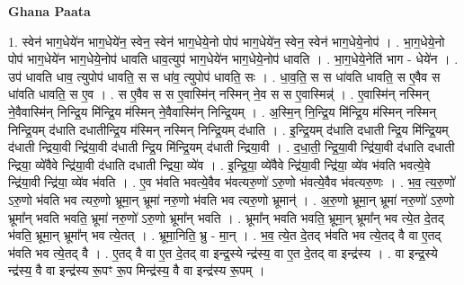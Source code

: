 \documentclass[17pt]{extarticle}
\begin{document}
\textbf{Ghana Paata } \newline

1. स्वेन॑ भाग॒धेये॑न भाग॒धेये॑न॒ स्वेन॒ स्वेन॑ भाग॒धेये॒नो पोप॑ भाग॒धेये॑न॒ स्वेन॒ स्वेन॑ भाग॒धेये॒नोप॑ । . भा॒ग॒धेये॒नो पोप॑ भाग॒धेये॑न भाग॒धेये॒नोप॑ धावति धाव॒त्युप॑ भाग॒धेये॑न भाग॒धेये॒नोप॑ धावति । . भा॒ग॒धेये॒नेति॑ भाग - धेये॑न । . उप॑ धावति धाव॒ त्युपोप॑ धावति॒ स स धा॑व॒ त्युपोप॑ धावति॒ सः । . धा॒व॒ति॒ स स धा॑वति धावति॒ स ए॒वैव स धा॑वति धावति॒ स ए॒व । . स ए॒वैव स स ए॒वास्मि॑न् नस्मिन् ने॒व स स ए॒वास्मिन्न्॑ । . ए॒वास्मि॑न् नस्मिन् ने॒वैवास्मि॑न् निन्द्रि॒य मि॑न्द्रि॒य म॑स्मिन् ने॒वैवास्मि॑न् निन्द्रि॒यम् । . अ॒स्मि॒न् नि॒न्द्रि॒य मि॑न्द्रि॒य म॑स्मिन् नस्मिन् निन्द्रि॒यम् द॑धाति दधातीन्द्रि॒य म॑स्मिन् नस्मिन् निन्द्रि॒यम् द॑धाति । . इ॒न्द्रि॒यम् द॑धाति दधाती न्द्रि॒य मि॑न्द्रि॒यम् द॑धाती न्द्रिया॒वी न्द्रि॑या॒वी द॑धाती न्द्रि॒य मि॑न्द्रि॒यम् द॑धाती न्द्रिया॒वी । . द॒धा॒ती॒ न्द्रि॒या॒वी न्द्रि॑या॒वी द॑धाति दधाती न्द्रिया॒ व्ये॑वैवे न्द्रि॑या॒वी द॑धाति दधाती न्द्रिया॒ व्ये॑व । . इ॒न्द्रि॒या॒ व्ये॑वैवे न्द्रि॑या॒वी न्द्रि॑या॒ व्ये॑व भ॑वति भवत्ये॒वे न्द्रि॑या॒वी न्द्रि॑या॒ व्ये॑व भ॑वति । . ए॒व भ॑वति भवत्ये॒वैव भ॑वत्यरु॒णो॑ ऽरु॒णो भ॑वत्ये॒वैव भ॑वत्यरु॒णः । . भ॒व॒ त्य॒रु॒णो॑ ऽरु॒णो भ॑वति भव त्यरु॒णो भ्रूमा॒न् भ्रूमा॑ नरु॒णो भ॑वति भव त्यरु॒णो भ्रूमान्॑ । . अ॒रु॒णो भ्रूमा॒न् भ्रूमा॑ नरु॒णो॑ ऽरु॒णो भ्रूमा᳚न् भवति भवति॒ भ्रूमा॑ नरु॒णो॑ ऽरु॒णो भ्रूमा᳚न् भवति । . भ्रूमा᳚न् भवति भवति॒ भ्रूमा॒न् भ्रूमा᳚न् भव त्ये॒त दे॒तद् भ॑वति॒ भ्रूमा॒न् भ्रूमा᳚न् भव त्ये॒तत् । . भ्रूमा॒निति॒ भ्रु - मा॒न् । . भ॒व॒ त्ये॒त दे॒तद् भ॑वति भव त्ये॒तद् वै वा ए॒तद् भ॑वति भव त्ये॒तद् वै । . ए॒तद् वै वा ए॒त दे॒तद् वा इन्द्र॒स्ये न्द्र॑स्य॒ वा ए॒त दे॒तद् वा इन्द्र॑स्य । . वा इन्द्र॒स्ये न्द्र॑स्य॒ वै वा इन्द्र॑स्य रू॒पꣳ रू॒प मिन्द्र॑स्य॒ वै वा इन्द्र॑स्य रू॒पम् । \newline
\end{document}
